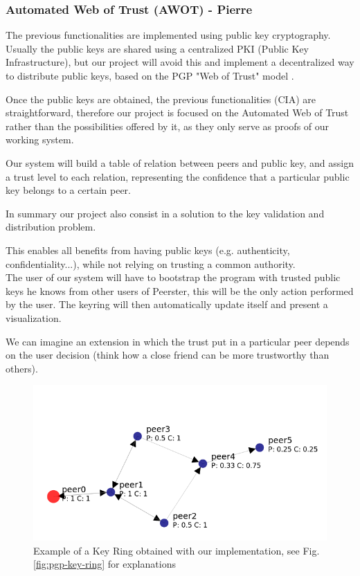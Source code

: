 \documentclass[]{article}
\begin{document}
\subsubsection{Automated Web of Trust (AWOT) - Pierre} 
The previous functionalities are implemented using public key cryptography. Usually the public keys are shared using a centralized PKI (Public Key Infrastructure), but our project will avoid this and implement a decentralized way to distribute public keys, based on the PGP "Web of Trust" model \cite{abdul1997pgp}.

Once the public keys are obtained, the previous functionalities (CIA) are straightforward, therefore our project is focused on the Automated Web of Trust rather than the possibilities offered by it, as they only serve as proofs of our working system.

Our system will build a table of relation between peers and public key, and assign a trust level to each relation, representing the confidence that a particular public key belongs to a certain peer.

In summary our project also consist in a solution to the key validation and distribution problem. 

This enables all benefits from having public keys (e.g. authenticity, confidentiality...), while not relying on trusting a common authority. \\

The user of our system will have to bootstrap the program with trusted public keys he knows from other users of Peerster, this will be the only action performed by the user. The keyring will then automatically update itself and present a visualization.

We can imagine an extension in which the trust put in a particular peer depends on the user decision (think how a close friend can be more trustworthy than others).


\begin{figure}[h]
	\includegraphics[width=\textwidth,height=\textheight,keepaspectratio]{keyring_example1}
	\centering
	\caption{Example of a Key Ring obtained with our implementation, see Fig. \ref{fig:pgp-key-ring} for explanations}
	\label{fig:keyring_ex1}
\end{figure}
\end{document}
